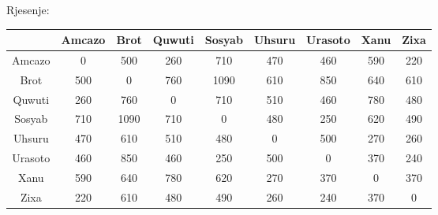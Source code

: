 \documentclass[12pt]{article}
\begin{document}
Rjesenje:

\begin{tabular}{ | c || c  | c | c | c | c | c | c | c | }
\hline
 & Amcazo & Brot & Quwuti & Sosyab & Uhsuru & Urasoto & Xanu & Zixa\\
 \hline
 \hline
Amcazo & 0 & 500 & 260 & 710 & 470 & 460 & 590 & 220\\
 \hline
Brot & 500 & 0 & 760 & 1090 & 610 & 850 & 640 & 610\\
 \hline
Quwuti & 260 & 760 & 0 & 710 & 510 & 460 & 780 & 480\\
 \hline
Sosyab & 710 & 1090 & 710 & 0 & 480 & 250 & 620 & 490\\
 \hline
Uhsuru & 470 & 610 & 510 & 480 & 0 & 500 & 270 & 260\\
 \hline
Urasoto & 460 & 850 & 460 & 250 & 500 & 0 & 370 & 240\\
 \hline
Xanu & 590 & 640 & 780 & 620 & 270 & 370 & 0 & 370\\
 \hline
Zixa & 220 & 610 & 480 & 490 & 260 & 240 & 370 & 0\\
 \hline
\end{tabular}
\end{document}
